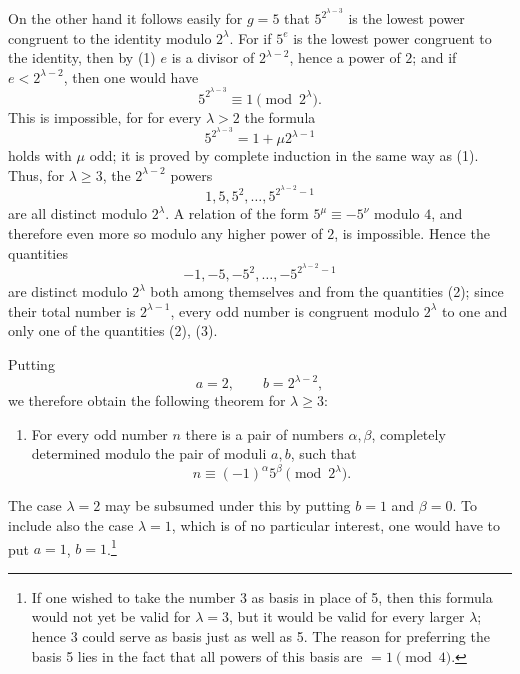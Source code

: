 \documentclass[11pt]{article}
\begin{document}
On the other hand it follows easily for $g=5$ that $5^{2^{\lambda-3}}$ is the lowest power congruent to the identity modulo $2^\lambda$. For if $5^e$ is the lowest power congruent to the identity, then by (1) $e$ is a divisor of $2^{\lambda-2}$, hence a power of $2$; and if $e<2^{\lambda-2}$, then one would have
\[
5^{2^{\lambda-3}}\equiv1\pmod{2^\lambda}.
\]
This is impossible, for for every $\lambda>2$ the formula
\[
5^{2^{\lambda-3}}=1+\mu 2^{\lambda-1}
\]
holds with $\mu$ odd; it is proved by complete induction in the same way as (1). Thus, for $\lambda\ge3$, the $2^{\lambda-2}$ powers
\begin{equation}
1,5,5^2,
\ldots,
5^{2^{\lambda-2}-1}
\tag{2}
\end{equation}
are all distinct modulo $2^\lambda$. A relation of the form $5^\mu\equiv-5^\nu$ modulo $4$, and therefore even more so modulo any higher power of $2$, is impossible. Hence the quantities
\begin{equation}
-1,-5,-5^2,
\ldots,
-5^{2^{\lambda-2}-1}
\tag{3}
\end{equation}
are distinct modulo $2^\lambda$ both among themselves and from the quantities (2); since their total number is $2^{\lambda-1}$, every odd number is congruent modulo $2^\lambda$ to one and only one of the quantities (2), (3).

Putting
\begin{equation}
a=2,
\qquad b=2^{\lambda-2},
\tag{4}
\end{equation}
we therefore obtain the following theorem for $\lambda\ge3$:

\begin{enumerate}[label=\arabic*.,start=3]
\item For every odd number $n$ there is a pair of numbers $\alpha,\beta$, completely determined modulo the pair of moduli $a,b$, such that
\[
n\equiv(-1)^\alpha5^\beta\pmod{2^\lambda}.
\]
\end{enumerate}

The case $\lambda=2$ may be subsumed under this by putting $b=1$ and $\beta=0$. To include also the case $\lambda=1$, which is of no particular interest, one would have to put $a=1$, $b=1$.\footnote{If one wished to take the number 3 as basis in place of 5, then this formula would not yet be valid for $\lambda=3$, but it would be valid for every larger $\lambda$; hence 3 could serve as basis just as well as 5. The reason for preferring the basis 5 lies in the fact that all powers of this basis are $=1\pmod4$.}
\end{document}
